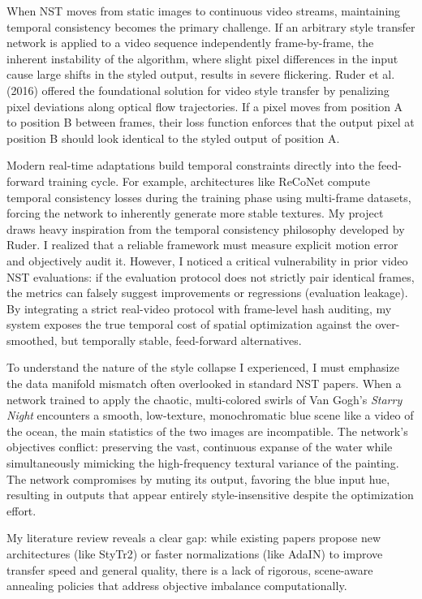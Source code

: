 \documentclass[12pt,letterpaper]{article}
\begin{document}
When NST moves from static images to continuous video streams, maintaining temporal consistency becomes the primary challenge. If an arbitrary style transfer network is applied to a video sequence independently frame-by-frame, the inherent instability of the algorithm, where slight pixel differences in the input cause large shifts in the styled output, results in severe flickering. Ruder et al. (2016) offered the foundational solution for video style transfer \cite{ruder2016} by penalizing pixel deviations along optical flow trajectories. If a pixel moves from position A to position B between frames, their loss function enforces that the output pixel at position B should look identical to the styled output of position A.

Modern real-time adaptations build temporal constraints directly into the feed-forward training cycle. For example, architectures like ReCoNet compute temporal consistency losses during the training phase using multi-frame datasets, forcing the network to inherently generate more stable textures. My project draws heavy inspiration from the temporal consistency philosophy developed by Ruder. I realized that a reliable framework must measure explicit motion error and objectively audit it. However, I noticed a critical vulnerability in prior video NST evaluations: if the evaluation protocol does not strictly pair identical frames, the metrics can falsely suggest improvements or regressions (evaluation leakage). By integrating a strict real-video protocol with frame-level hash auditing, my system exposes the true temporal cost of spatial optimization against the over-smoothed, but temporally stable, feed-forward alternatives.

To understand the nature of the style collapse I experienced, I must emphasize the data manifold mismatch often overlooked in standard NST papers. When a network trained to apply the chaotic, multi-colored swirls of Van Gogh's \emph{Starry Night} encounters a smooth, low-texture, monochromatic blue scene like a video of the ocean, the main statistics of the two images are incompatible. The network's objectives conflict: preserving the vast, continuous expanse of the water while simultaneously mimicking the high-frequency textural variance of the painting. The network compromises by muting its output, favoring the blue input hue, resulting in outputs that appear entirely style-insensitive despite the optimization effort.

My literature review reveals a clear gap: while existing papers propose new architectures (like StyTr2) or faster normalizations (like AdaIN) to improve transfer speed and general quality, there is a lack of rigorous, scene-aware annealing policies that address objective imbalance computationally.
\end{document}
